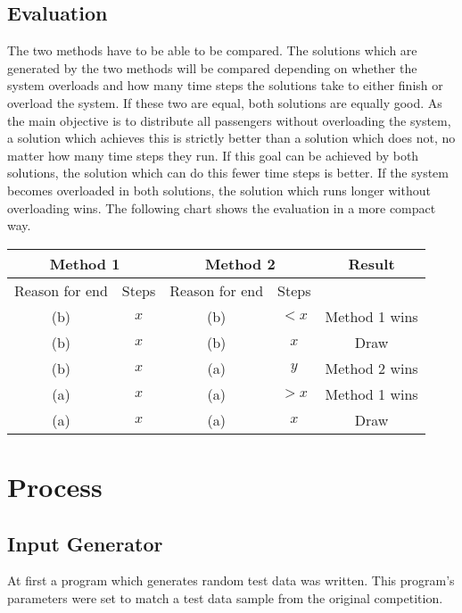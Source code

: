 \documentclass[10pt]{report}
\begin{document}
\section{Evaluation}
The two methods have to be able to be compared. The solutions which are generated by the two methods will be compared depending on whether the system overloads and how many time steps the solutions take to either finish or overload the system. If these two are equal, both solutions are equally good. As the main objective is to distribute all passengers without overloading the system, a solution which achieves this is strictly better than a solution which does not, no matter how many time steps they run. If this goal can be achieved by both solutions, the solution which can do this fewer time steps is better. If the system becomes overloaded in both solutions, the solution which runs longer without overloading wins. The following chart shows the evaluation in a more compact way.

\begin{tabular}{|c|c|c|c|c|}
    \hline
    \multicolumn{2}{|c|}{Method 1} & \multicolumn{2}{|c|}{Method 2} & \multirow{2}{*}{Result}                         \\ \hline
    Reason for end                 & Steps                          & Reason for end          & Steps &               \\ \hline
    (b)                            & $x$                            & (b)                     & $< x$ & Method 1 wins \\ \hline
    (b)                            & $x$                            & (b)                     & $x$   & Draw          \\ \hline
    (b)                            & $x$                            & (a)                     & $y$   & Method 2 wins \\ \hline
    (a)                            & $x$                            & (a)                     & $>x$  & Method 1 wins \\ \hline
    (a)                            & $x$                            & (a)                     & $x$   & Draw          \\ \hline
\end{tabular}


\chapter{Process}
\section{Input Generator}
At first a program which generates random test data was written. This program’s parameters were set to match a test data sample from the original competition.
\end{document}
